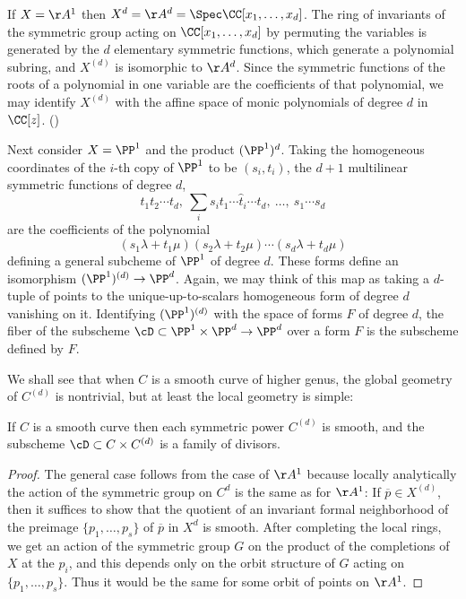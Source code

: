 If $X=\AA^{1}$ then $X^{d} = \AA^{d} = \Spec \CC[x_{1}, \dots, x_{d}]$. The ring of invariants of the symmetric group acting on
$\CC[x_{1}, \dots, x_{d}]$ by permuting the variables is generated by the $d$ elementary symmetric functions, which generate a polynomial subring, and $X^{(d)}$ is isomorphic to $\AA^{d}$. Since the symmetric functions of the roots of a polynomial in one variable are the coefficients of
that polynomial, we may identify $X^{(d)}$ with the affine space of monic polynomials of degree $d$ in $\CC[z]$. (\cite[Exercises 1.6, 13.2-13.4]{Eisenbud1995})

Next consider $X = \PP^1$ and the product $(\PP^1)^d$. Taking the homogeneous coordinates of the
$i$-th copy of $\PP^1$ to be $(s_i,t_i)$, the $d+1$ multilinear symmetric functions of degree $d$,
$$
t_1t_2\cdots t_d,\ \sum_i s_it_1\cdots\hat t_i\cdots t_d,\ \dots,\ s_1\cdots s_d
$$
are the coefficients of the polynomial
$$
(s_1\lambda + t_1\mu)(s_2\lambda + t_2\mu)\cdots(s_d\lambda + t_d\mu)
$$
defining a general subcheme of $\PP^1$ of degree $d$. These forms  define
an isomorphism $(\PP^1)^{(d)} \to \PP^d$. 
Again, we may think of this map as taking a $d$-tuple of points to the unique-up-to-scalars
homogeneous form of degree $d$ vanishing on it.
Identifying $(\PP^1)^{(d)}$ with the space of forms
$F$ of degree $d$, the fiber of the subscheme $\cD\subset \PP^1 \times \PP^d \to \PP^d$
over a form $F$ is the subscheme defined by $F$.

We shall see that when $C$ is a smooth curve of higher genus, the global geometry of $C^{(d)}$ is nontrivial, but at least the local geometry is simple:

\begin{proposition}
If $C$ is a smooth curve then each symmetric power $C^{(d)}$ is smooth, and the subscheme
$\cD \subset C\times C^{(d)}$ is a family of divisors.
\end{proposition}

\begin{proof}
 The general case follows from the case of $\AA^{1}$ because locally analytically the action of the symmetric group on $C^d$ is the same as for $\AA^1$: If  $\overline p \in X^{(d)}$, then it suffices to
 show that the quotient of an invariant formal neighborhood of the preimage $\{p_1,\dots, p_s\}$ of
 $\overline p$ in $X^d$  is smooth. After completing the local rings, we get an action of the symmetric group
 $G$ on the product of the completions of $X$ at the $p_i$, and this depends only on the orbit
 structure of $G$ acting on $\{p_1,\dots, p_s\}$. Thus it would be the same for some orbit of
 points on $\AA^1$.
 \end{proof}

